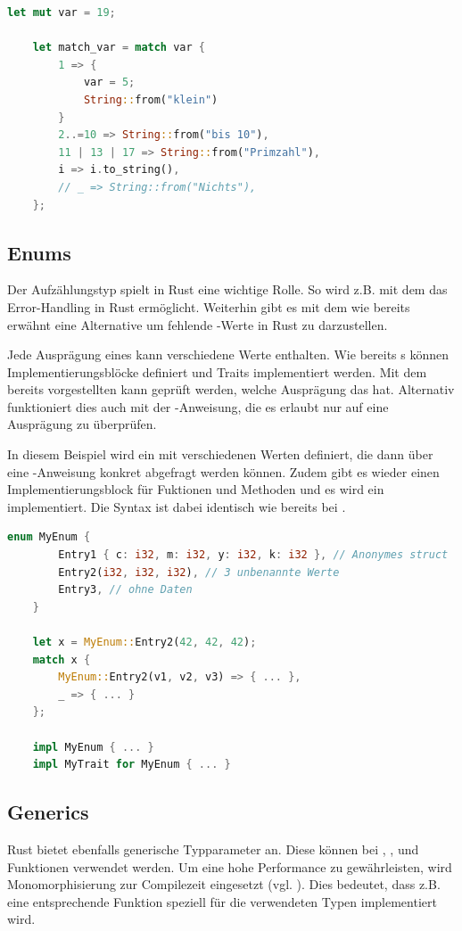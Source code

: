 \documentclass[11pt,a4paper, ngerman]{article}
\begin{document}
\begin{lstlisting}[language=rust, caption={match}]
    let mut var = 19;

    let match_var = match var {
        1 => {
            var = 5;
            String::from("klein")
        }
        2..=10 => String::from("bis 10"),
        11 | 13 | 17 => String::from("Primzahl"),
        i => i.to_string(),
        // _ => String::from("Nichts"),
    };
\end{lstlisting}

\subsection{Enums}
Der Aufzählungstyp  spielt in Rust eine wichtige Rolle. So wird z.B. mit dem   das Error-Handling in Rust ermöglicht. Weiterhin gibt es mit dem   wie bereits erwähnt eine Alternative um fehlende -Werte in Rust zu darzustellen.

Jede Ausprägung eines  kann verschiedene Werte enthalten. Wie bereits s können Implementierungsblöcke definiert und Traits implementiert werden. Mit dem bereits vorgestellten  kann geprüft werden, welche Ausprägung das  hat. Alternativ funktioniert dies auch mit der -Anweisung, die es erlaubt nur auf eine Ausprägung zu überprüfen.

In diesem Beispiel wird ein  mit verschiedenen Werten definiert, die dann über eine -Anweisung konkret abgefragt werden können. Zudem gibt es wieder einen Implementierungsblock für Fuktionen und Methoden und es wird ein  implementiert. Die Syntax ist dabei identisch wie bereits bei .

\begin{lstlisting}[language=rust, caption={enum}]
    enum MyEnum {
        Entry1 { c: i32, m: i32, y: i32, k: i32 }, // Anonymes struct
        Entry2(i32, i32, i32), // 3 unbenannte Werte
        Entry3, // ohne Daten
    }

    let x = MyEnum::Entry2(42, 42, 42);
    match x {
        MyEnum::Entry2(v1, v2, v3) => { ... },
        _ => { ... }
    };

    impl MyEnum { ... }
    impl MyTrait for MyEnum { ... }
\end{lstlisting}

\subsection{Generics}
Rust bietet ebenfalls generische Typparameter an. Diese können bei , ,  und Funktionen verwendet werden. Um eine hohe Performance zu gewährleisten, wird Monomorphisierung zur Compilezeit eingesetzt (vgl. \cite[S. 196 ff.]{SK19}). Dies bedeutet, dass z.B. eine entsprechende Funktion speziell für die verwendeten Typen implementiert wird.
\end{document}
